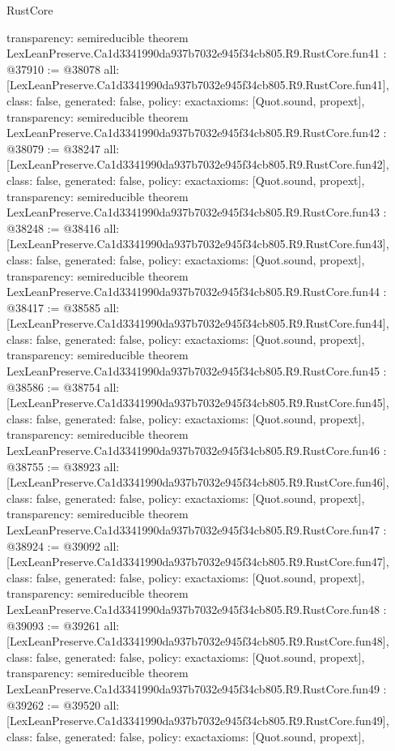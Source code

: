 \begin{lexlean}{RustCore}
\begin{coremodule}
{  transparency: semireducible
}
theorem LexLeanPreserve.Ca1d3341990da937b7032e945f34cb805.R9.RustCore.fun41 : @37910 := @38078 {
  all: [LexLeanPreserve.Ca1d3341990da937b7032e945f34cb805.R9.RustCore.fun41],
  class: false,
  generated: false,
  policy: exact{axioms: [Quot.sound, propext]},
  transparency: semireducible
}
theorem LexLeanPreserve.Ca1d3341990da937b7032e945f34cb805.R9.RustCore.fun42 : @38079 := @38247 {
  all: [LexLeanPreserve.Ca1d3341990da937b7032e945f34cb805.R9.RustCore.fun42],
  class: false,
  generated: false,
  policy: exact{axioms: [Quot.sound, propext]},
  transparency: semireducible
}
theorem LexLeanPreserve.Ca1d3341990da937b7032e945f34cb805.R9.RustCore.fun43 : @38248 := @38416 {
  all: [LexLeanPreserve.Ca1d3341990da937b7032e945f34cb805.R9.RustCore.fun43],
  class: false,
  generated: false,
  policy: exact{axioms: [Quot.sound, propext]},
  transparency: semireducible
}
theorem LexLeanPreserve.Ca1d3341990da937b7032e945f34cb805.R9.RustCore.fun44 : @38417 := @38585 {
  all: [LexLeanPreserve.Ca1d3341990da937b7032e945f34cb805.R9.RustCore.fun44],
  class: false,
  generated: false,
  policy: exact{axioms: [Quot.sound, propext]},
  transparency: semireducible
}
theorem LexLeanPreserve.Ca1d3341990da937b7032e945f34cb805.R9.RustCore.fun45 : @38586 := @38754 {
  all: [LexLeanPreserve.Ca1d3341990da937b7032e945f34cb805.R9.RustCore.fun45],
  class: false,
  generated: false,
  policy: exact{axioms: [Quot.sound, propext]},
  transparency: semireducible
}
theorem LexLeanPreserve.Ca1d3341990da937b7032e945f34cb805.R9.RustCore.fun46 : @38755 := @38923 {
  all: [LexLeanPreserve.Ca1d3341990da937b7032e945f34cb805.R9.RustCore.fun46],
  class: false,
  generated: false,
  policy: exact{axioms: [Quot.sound, propext]},
  transparency: semireducible
}
theorem LexLeanPreserve.Ca1d3341990da937b7032e945f34cb805.R9.RustCore.fun47 : @38924 := @39092 {
  all: [LexLeanPreserve.Ca1d3341990da937b7032e945f34cb805.R9.RustCore.fun47],
  class: false,
  generated: false,
  policy: exact{axioms: [Quot.sound, propext]},
  transparency: semireducible
}
theorem LexLeanPreserve.Ca1d3341990da937b7032e945f34cb805.R9.RustCore.fun48 : @39093 := @39261 {
  all: [LexLeanPreserve.Ca1d3341990da937b7032e945f34cb805.R9.RustCore.fun48],
  class: false,
  generated: false,
  policy: exact{axioms: [Quot.sound, propext]},
  transparency: semireducible
}
theorem LexLeanPreserve.Ca1d3341990da937b7032e945f34cb805.R9.RustCore.fun49 : @39262 := @39520 {
  all: [LexLeanPreserve.Ca1d3341990da937b7032e945f34cb805.R9.RustCore.fun49],
  class: false,
  generated: false,
  policy: exact{axioms: [Quot.sound, propext]},
}
\end{coremodule}
\end{lexlean}
